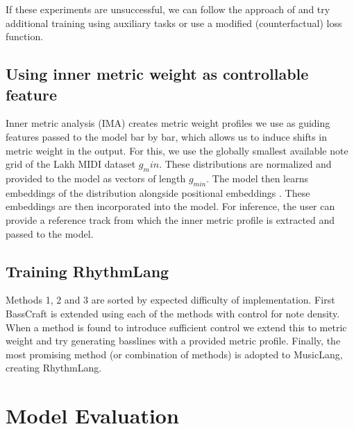 If these experiments are unsuccessful, we can follow the approach of \cite{Shu_Xu_Musebarcontrol_2024} and try additional training using auxiliary tasks or use a modified (counterfactual) loss function. 

\subsection{Using inner metric weight as controllable feature}
Inner metric analysis (IMA) creates metric weight profiles we use as guiding features passed to the model bar by bar, which allows us to induce shifts in metric weight in the output. 
For this, we use the globally smallest available note grid of the Lakh MIDI dataset $g_min$. These distributions are normalized and provided to the model as vectors of length $g_{min}$.
The model then learns embeddings of the distribution alongside positional embeddings \cite{Lin_cocomulla_2024}. These embeddings are then incorporated into the model. For inference, the user can provide a reference track from which the inner metric profile is extracted and passed to the model. 

\subsection{Training RhythmLang}
Methods 1, 2 and 3 are sorted by expected difficulty of implementation. First BassCraft is extended using each of the methods with control for note density. When a method is found to introduce sufficient control we extend this to metric weight and try generating basslines with a provided metric profile. Finally, the most promising method (or combination of methods) is adopted to MusicLang, creating RhythmLang.

\section{Model Evaluation}
